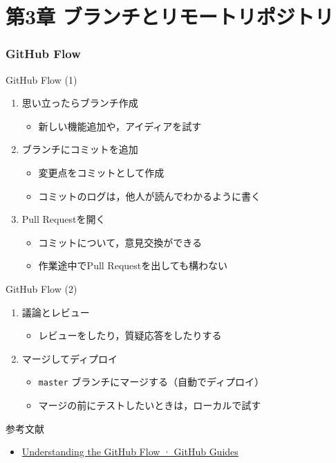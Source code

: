 \documentclass[t, aspectratio=169]{beamer}
\begin{document}
\part{第3章 ブランチとリモートリポジトリ}
\label{sec-3}
\section{GitHub Flow}
\label{sec-3-1}
\begin{frame}[label=sec-3-1-1]{GitHub Flow (1)}
\begin{enumerate}
\item 思い立ったらブランチ作成
\begin{itemize}
\item 新しい機能追加や，アイディアを試す
\end{itemize}
\item ブランチにコミットを追加
\begin{itemize}
\item 変更点をコミットとして作成
\item コミットのログは，他人が読んでわかるように書く
\end{itemize}
\item Pull Requestを開く
\begin{itemize}
\item コミットについて，意見交換ができる
\item 作業途中でPull Requestを出しても構わない
\end{itemize}
\end{enumerate}
\end{frame}

\begin{frame}[fragile,label=sec-3-1-2]{GitHub Flow (2)}
 \begin{enumerate}
\item 議論とレビュー
\begin{itemize}
\item レビューをしたり，質疑応答をしたりする
\end{itemize}
\item マージしてディプロイ
\begin{itemize}
\item \texttt{master} ブランチにマージする（自動でディプロイ）
\item マージの前にテストしたいときは，ローカルで試す
\end{itemize}
\end{enumerate}
参考文献
\begin{itemize}
\item \href{https://guides.github.com/introduction/flow/index.html}{Understanding the GitHub Flow · GitHub Guides}
\end{itemize}
\end{frame}
\end{document}
